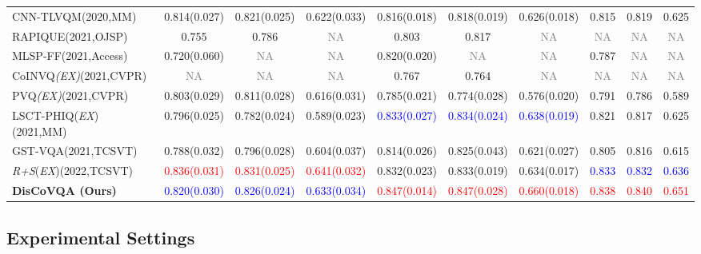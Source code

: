 \documentclass[journal]{IEEEtran}
\newcommand{\blue}[1]{\textcolor{blue}{#1}}
\newcommand{\gray}[1]{\textcolor{gray}{#1}}
\newcommand{\textbfred}[1]{\textcolor{red}{{#1}}}
\begin{document}
\begin{table*}[]
{\begin{tabular}{l|ccc|ccc|ccc}
CNN-TLVQM\cite{cnntlvqm}(2020,MM) & 0.814(0.027) & 0.821(0.025) & 0.622(0.033) & 0.816(0.018) & 0.818(0.019) & 0.626(0.018) & 0.815 & 0.819 & 0.625 \\
RAPIQUE\cite{rapique}(2021,OJSP)          & 0.755       & 0.786        & \gray{NA}   & 0.803         & 0.817       & \gray{NA}   & \gray{NA} & \gray{NA} & \gray{NA}   \\
MLSP-FF\cite{mlsp}(2021,Access)         & 0.720(0.060)          & \gray{NA}                   & \gray{NA}            & 0.820(0.020)          & \gray{NA}                   & \gray{NA}            & {0.787} & \gray{NA} & \gray{NA}    \\
CoINVQ\textit{(EX)}\cite{rfugc}(2021,CVPR)          & \gray{NA}       & \gray{NA}        & \gray{NA}   & 0.767         & 0.764       & \gray{NA}   & \gray{NA} & \gray{NA} & \gray{NA}   \\ 
PVQ\textit{(EX)}\cite{pvq}(2021,CVPR)          & {0.803(0.029)}     & {0.811(0.028) }         & {0.616(0.031)}  & 0.785(0.021)         & 0.774(0.028)       & 0.576(0.020)   & 0.791 & 0.786 & 0.589  \\ 
LSCT-PHIQ(\textit{EX})\cite{lsctphiq}(2021,MM)         & 0.796(0.025)         & 0.782(0.024)                 & 0.589(0.023)           & \blue{0.833(0.027)}          & \blue{0.834(0.024)}                   & \blue{0.638(0.019)}             & 0.821 & 0.817 & 0.625    \\
GST-VQA\cite{gstvqa}(2021,TCSVT) & 0.788(0.032) & 0.796(0.028) & 0.604(0.037) & 0.814(0.026) & 0.825(0.043) & 0.621(0.027) & 0.805 & 0.816 & 0.615 \\
\textit{R+S}(\textit{EX})\cite{bvqa2022}(2022,TCSVT)         &\textbfred{0.836(0.031)}&\textbfred{0.831(0.025)}&\textbfred{0.641(0.032)}&0.832(0.023)&0.833(0.019)&0.634(0.017)&\blue{0.833}&\blue{0.832}&\blue{0.636}    \\\hline
\textbf{DisCoVQA (Ours)}    & \blue{0.820(0.030)} & \blue{0.826(0.024)} & \blue{0.633(0.034)} & \textbfred{0.847(0.014)} & \textbfred{0.847(0.028)} & \textbfred{0.660(0.018)} & \textbfred{0.838} & \textbfred{0.840} & \textbfred{0.651} \\ \hline
\end{tabular}}
\end{table*}







\subsection{Experimental Settings}
\end{document}
